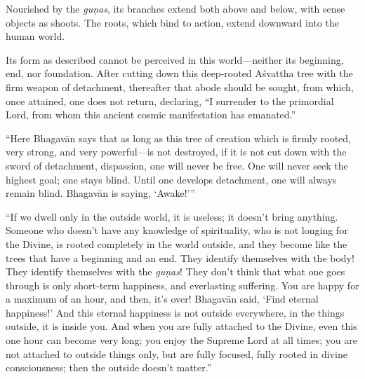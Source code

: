 {Nourished by the \textit{guṇas}, its branches extend both above and below, with sense objects as shoots. The roots, which bind to action, extend downward into the human world.}

{Its form as described cannot be perceived in this world---neither its beginning, end, nor foundation. After cutting down this deep-rooted Aśvattha tree with the firm weapon of detachment, thereafter that abode should be sought, from which, once attained, one does not return, declaring, \enquote{I surrender to the primordial Lord, from whom this ancient cosmic manifestation has emanated.}}

\enquote{Here Bhagavān says that as long as this tree of creation which is firmly rooted, very strong, and very powerful---is not destroyed, if it is not cut down with the sword of detachment, dispassion, one will never be free. One will never seek the highest goal; one stays blind. Until one develops detachment, one will always remain blind. Bhagavān is saying, \enquote{Awake!}}

\enquote{If we dwell only in the outside world, it is useless; it doesn’t bring anything. Someone who doesn’t have any knowledge of spirituality, who is not longing for the Divine, is rooted completely in the world outside, and they become like the trees that have a beginning and an end. They identify themselves with the body! They identify themselves with the \textit{guṇas}! They don’t think that what one goes through is only short-term happiness, and everlasting suffering. You are happy for a maximum of an hour, and then, it’s over! Bhagavān said, \enquote{Find eternal happiness!} And this eternal happiness is not outside everywhere, in the things outside, it is inside you. And when you are fully attached to the Divine, even this one hour can become very long; you enjoy the Supreme Lord at all times; you are not attached to outside things only, but are fully focused, fully rooted in divine consciousness; then the outside doesn’t matter.}

